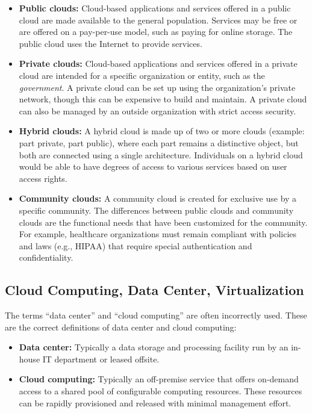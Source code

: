 \begin{itemize}
\item \textbf{Public clouds:} Cloud-based applications and services offered in a public cloud are made available to the general population. Services may be free or are offered on a pay-per-use model, such as paying for online storage. The public cloud uses the Internet to provide services.
\item \textbf{Private clouds:} Cloud-based applications and services offered in a private cloud are intended for a specific organization or entity, such as the \emph{government}. A private cloud can be set up using the organization's private network, though this can be expensive to build and maintain. A private cloud can also be managed by an outside organization with strict access security.
\item \textbf{Hybrid clouds:} A hybrid cloud is made up of two or more clouds (example: part private, part public), where each part remains a distinctive object, but both are connected using a single architecture. Individuals on a hybrid cloud would be able to have degrees of access to various services based on user access rights.
\item \textbf{Community clouds:} A community cloud is created for exclusive use by a specific community. The differences between public clouds and community clouds are the functional needs that have been customized for the community. For example, healthcare organizations must remain compliant with policies and laws (e.g., HIPAA) that require special authentication and confidentiality.
\end{itemize}

\subsection{Cloud Computing, Data Center, Virtualization}

The terms ``data center'' and ``cloud computing'' are often incorrectly used. These are the correct definitions of data center and cloud computing:

\begin{itemize}
\item \textbf{Data center:} Typically a data storage and processing facility run by an in-house IT department or leased offsite.
\item \textbf{Cloud computing:} Typically an off-premise service that offers on-demand access to a shared pool of configurable computing resources. These resources can be rapidly provisioned and released with minimal management effort.
\end{itemize}

